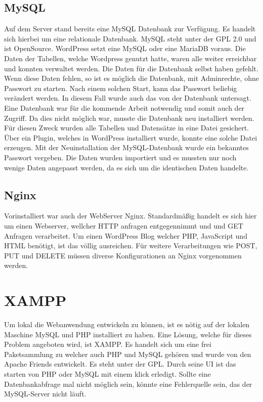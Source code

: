\subsection{MySQL}
Auf dem Server stand bereits eine MySQL Datenbank zur Verfügung.  Es handelt sich hierbei um eine relationale Datenbank. \autocite{Oracle.} MySQL steht unter der \ac{GPL} 2.0 und ist OpenSource. WordPress setzt eine MySQL oder eine MariaDB voraus.\autocite{akbarali} Die Daten der Tabellen, welche Wordpress genutzt hatte, waren alle weiter erreichbar und konnten verwaltet werden. Die Daten für die Datenbank selbst haben gefehlt. Wenn diese Daten fehlen, so ist es möglich die Datenbank, mit Adminrechte, ohne Passwort zu starten. Nach einem solchen Start, kann das Passwort beliebig verändert werden. In diesem Fall wurde auch das von der Datenbank untersagt. Eine Datenbank war für die kommende Arbeit notwendig und somit auch der Zugriff. Da dies nicht möglich war, musste die Datenbank neu installiert werden. Für diesen Zweck wurden alle Tabellen und Datensätze in eine Datei gesichert. Über ein Plugin, welches in WordPress installiert wurde, konnte eine solche Datei erzeugen. Mit der Neuinstallation der MySQL-Datenbank wurde ein bekanntes Passwort vergeben. Die Daten wurden importiert und es mussten nur noch wenige Daten angepasst werden, da es sich um die identischen Daten handelte. 

\subsection{Nginx}
Vorinstalliert war auch der WebServer Nginx. Standardmäßig handelt es sich hier um einen Webserver, wellcher HTTP anfragen entgegennimmt und und GET Anfragen verarbeitet. Um einen WordPress Blog welcher \ac{PHP}, JavaScript und \ac{HTML} benötigt, ist das völlig ausreichen.\autocite{akbarali} Für weitere Verarbeitungen wie POST, PUT und DELETE müssen diverse Konfigurationen an Nginx vorgenommen werden.\autocite{MFB.2013}

\section{XAMPP}
Um lokal die Webanwendung entwickeln zu können, ist es nötig auf der lokalen Maschine MySQL und \ac{PHP} installiert zu haben. Eine Lösung, welche für dieses Problem angeboten wird, ist XAMPP. Es handelt sich um eine frei Paketsammlung zu welcher auch \ac{PHP} und MySQL gehören und wurde von den Apache Friends entwickelt.\autocite{ApacheFriends.} Es steht unter der \ac{GPL}. Durch seine \ac{UI} ist das starten von \ac{PHP} oder MySQL mit einem klick erledigt. Sollte eine Datenbankabfrage mal nicht möglich sein, könnte eine Fehlerquelle sein, das der MySQL-Server nicht läuft. 

